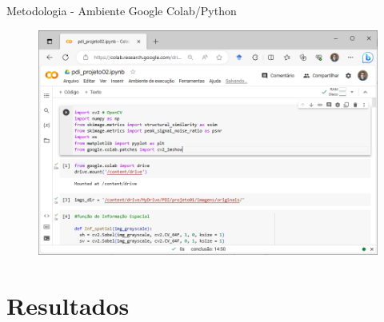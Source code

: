 \documentclass[]{beamer}
\begin{document}
\begin{frame}{Metodologia - Ambiente Google Colab/Python}
    \begin{figure}
        \includegraphics[scale=0.4]{Imagens/metodologia-colab.png}
    \end{figure}  
\end{frame}

\section{Resultados}
\end{document}
